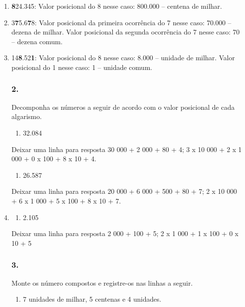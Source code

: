\begin{enumerate}
\def\labelenumi{\alph{enumi})}
\item
  \textbf{8}24.345:
  Valor posicional do 8 nesse caso: 800.000 -- centena de milhar.
\item
  3\textbf{7}5.6\textbf{7}8:
  Valor posicional da primeira ocorrência do 7 nesse caso: 70.000 -- dezena de milhar.
  Valor posicional da segunda ocorrência do 7 nesse caso: 70 -- dezena comum.
\item
  14\textbf{8}.52\textbf{1}:
  Valor posicional do 8 nesse caso: 8.000 -- unidade de milhar.
  Valor posicional do 1 nesse caso: 1 -- unidade comum.

\subsubsection{2.}\label{section-1}

Decomponha os números a seguir de acordo com o valor posicional de cada
algarismo.

\begin{enumerate}
\def\labelenumi{\alph{enumi})}
\item
  32.084
\end{enumerate}

Deixar uma linha para resposta
30 000 + 2 000 + 80 + 4; 3 x 10 000 + 2 x 1 000 + 0 x 100 + 8 x 10 + 4.

\begin{enumerate}
\def\labelenumi{\alph{enumi})}
\item
  26.587
\end{enumerate}

Deixar uma linha para resposta
20 000 + 6 000 + 500 + 80 + 7; 2 x 10 000 + 6 x 1 000 + 5 x 100 + 8
  x 10 + 7.
\item
  
\begin{enumerate}
\def\labelenumi{\alph{enumi})}
\item
  2.105
\end{enumerate}

Deixar uma linha para resposta
2 000 + 100 + 5; 2 x 1 000 + 1 x 100 + 0 x 10 + 5


\subsubsection{3.}\label{section-2}

Monte os número compostos e registre-os nas linhas a seguir.

\begin{enumerate}
\def\labelenumi{\alph{enumi})}
\item
  7 unidades de milhar, 5 centenas e 4 unidades.
\end{enumerate}


\end{enumerate}
